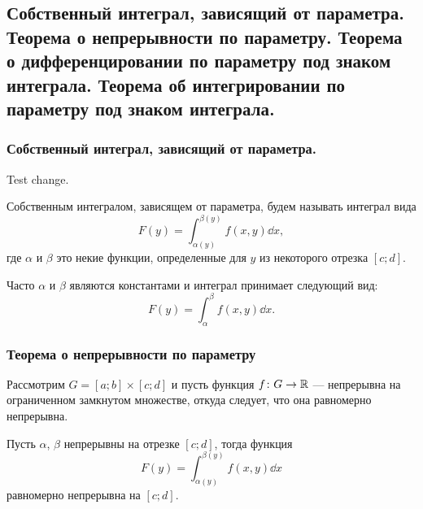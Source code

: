 \subsection{Собственный интеграл, зависящий от параметра. Теорема о непрерывности по параметру. Теорема о дифференцировании по параметру под знаком интеграла. Теорема об интегрировании по параметру под знаком интеграла.}

\subsubsection{Собственный интеграл, зависящий от параметра.}

Test change.

\begin{definition*}
    Собственным интегралом, зависящем от параметра, будем называть интеграл вида
    \begin{equation*}
        F(y) = \int_{\alpha(y)}^{\beta(y)} f(x, y) \dd x,
    \end{equation*}
    где $\alpha$ и $\beta$ это некие функции, определенные для $y$ из некоторого отрезка $[c; d]$. 

    Часто $\alpha$ и $\beta$ являются константами и интеграл принимает следующий вид:
    \begin{equation*}
        F(y) = \int_{\alpha}^{\beta} f(x, y) \dd x.
    \end{equation*}
\end{definition*}

\subsubsection{Теорема о непрерывности по параметру}

\begin{theorem*}
    Рассмотрим $G = [a; b] \times [c; d]$ и пусть функция $f\colon G \to \mathbb{R}$ --- непрерывна на ограниченном замкнутом множестве, откуда следует, что она равномерно непрерывна.

    Пусть $\alpha$, $\beta$ непрерывны на отрезке $[c; d]$, тогда функция
    \begin{equation*}
        F(y) = \int_{\alpha(y)}^{\beta(y)} f(x, y) \dd x
    \end{equation*}
    равномерно непрерывна на $[c; d]$.
\end{theorem*}

